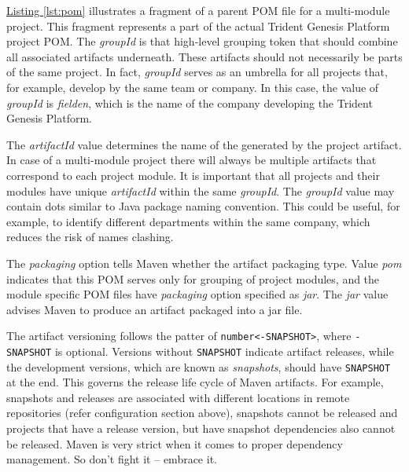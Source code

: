   \hyperref[lst:pom]{Listing \ref{lst:pom}} illustrates a fragment of a parent POM file for a multi-module project.
  This fragment represents a part of the actual Trident Genesis Platform project POM.
  The \emph{groupId} is that high-level grouping token that should combine all associated artifacts underneath.
  These artifacts should not necessarily be parts of the same project.
  In fact, \emph{groupId} serves as an umbrella for all projects that, for example, develop by the same team or company.
  In this case, the value of \emph{groupId} is \emph{fielden}, which is the name of the company developing the Trident Genesis Platform.
  
  The \emph{artifactId} value determines the name of the generated by the project artifact.
  In case of a multi-module project there will always be multiple artifacts that correspond to each project module.
  It is important that all projects and their modules have unique \emph{artifactId} within the same \emph{groupId}.
  The \emph{groupId} value may contain dots similar to Java package naming convention.  
  This could be useful, for example, to identify different departments within the same company, which reduces the risk of names clashing.
  
  The \emph{packaging} option tells Maven whether the artifact packaging type.
  Value \emph{pom} indicates that this POM serves only for grouping of project modules, and the module specific POM files have \emph{packaging} option specified as \emph{jar}.
  The \emph{jar} value advises Maven to produce an artifact packaged into a jar file.

  The artifact versioning follows the patter of \texttt{number<-SNAPSHOT>}, where \texttt{-SNAPSHOT} is optional.
  Versions without \texttt{SNAPSHOT} indicate artifact releases, while the development versions, which are known as \emph{snapshots}, should have \texttt{SNAPSHOT} at the end.
  This governs the release life cycle of Maven artifacts.
  For example, snapshots and releases are associated with different locations in remote repositories (refer configuration section above), snapshots cannot be released and projects that have a release version, but have snapshot dependencies also cannot be released.
  Maven is very strict when it comes to proper dependency management.
  So don't fight it -- embrace it.
  
